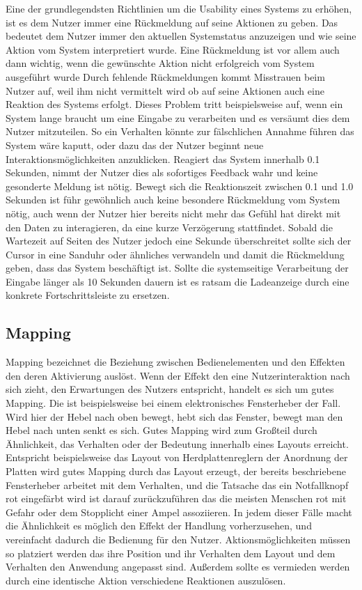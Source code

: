 Eine der grundlegendsten Richtlinien um die Usability eines Systems zu erhöhen, ist es dem Nutzer immer eine Rückmeldung auf seine Aktionen zu geben.
Das bedeutet dem Nutzer immer den aktuellen Systemstatus anzuzeigen und wie seine Aktion vom System interpretiert wurde.
Eine Rückmeldung ist vor allem auch dann wichtig, wenn die gewünschte Aktion nicht erfolgreich vom System ausgeführt wurde
Durch fehlende Rückmeldungen kommt Misstrauen beim Nutzer auf, weil ihm nicht vermittelt wird ob auf seine Aktionen auch eine Reaktion des Systems erfolgt\cite{Knight.2019c}.
Dieses Problem tritt beispielsweise auf, wenn ein System lange braucht um eine Eingabe zu verarbeiten und es versäumt dies dem Nutzer mitzuteilen.
So ein Verhalten könnte zur fälschlichen Annahme führen das System wäre kaputt, oder dazu das der Nutzer beginnt neue Interaktionsmöglichkeiten anzuklicken.
Reagiert das System innerhalb 0.1 Sekunden, nimmt der Nutzer dies als sofortiges Feedback wahr und keine gesonderte Meldung ist nötig.
Bewegt sich die Reaktionszeit zwischen 0.1 und 1.0 Sekunden ist führ gewöhnlich auch keine besondere Rückmeldung vom System nötig, auch wenn der Nutzer hier bereits nicht mehr das Gefühl hat direkt mit den Daten zu interagieren, da eine kurze Verzögerung stattfindet.
Sobald die Wartezeit auf Seiten des Nutzer jedoch eine Sekunde überschreitet sollte sich der Cursor in eine Sanduhr oder ähnliches verwandeln und damit die Rückmeldung geben, dass das System beschäftigt ist.
Sollte die systemseitige Verarbeitung der Eingabe länger als 10 Sekunden dauern ist es ratsam die Ladeanzeige durch eine konkrete Fortschrittsleiste zu ersetzen\cite{Nielsen.1995?}.

\subsection*{Mapping}
Mapping bezeichnet die Beziehung  zwischen Bedienelementen und den Effekten den deren Aktivierung auslöst.
Wenn der Effekt den eine Nutzerinteraktion nach sich zieht, den Erwartungen des Nutzers entspricht, handelt es sich um gutes Mapping.
Die ist beispielsweise bei einem elektronisches Fensterheber der Fall. Wird hier der Hebel nach oben bewegt, hebt sich das Fenster, bewegt man den Hebel nach unten senkt es sich.
Gutes Mapping wird zum Großteil durch Ähnlichkeit, das Verhalten oder der Bedeutung innerhalb eines Layouts erreicht.
Entspricht beispielsweise das Layout von Herdplattenreglern der Anordnung der Platten wird gutes Mapping durch das Layout erzeugt, der bereits beschriebene Fensterheber arbeitet mit dem Verhalten, und die Tatsache das ein Notfallknopf rot eingefärbt wird ist darauf zurückzuführen das die meisten Menschen rot mit Gefahr oder dem Stopplicht einer Ampel assoziieren.
In jedem dieser Fälle macht die Ähnlichkeit es möglich den Effekt der Handlung vorherzusehen, und vereinfacht dadurch die Bedienung für den Nutzer.
Aktionsmöglichkeiten müssen so platziert werden das ihre Position und ihr Verhalten dem Layout und dem Verhalten den Anwendung angepasst sind. 
Außerdem sollte es vermieden werden durch eine identische Aktion verschiedene Reaktionen auszulösen\cite{Lidwell.2010}.

